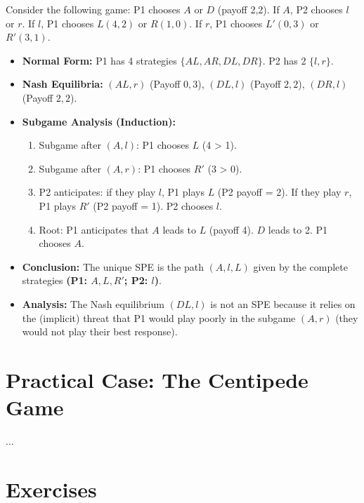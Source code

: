\begin{exemple}
Consider the following game: P1 chooses $A$ or $D$ (payoff 2,2). If $A$, P2 chooses $l$ or $r$. If $l$, P1 chooses $L(4,2)$ or $R(1,0)$. If $r$, P1 chooses $L'(0,3)$ or $R'(3,1)$.
\begin{itemize}
    \item \textbf{Normal Form:} P1 has 4 strategies $\{AL, AR, DL, DR\}$. P2 has 2 $\{l, r\}$.
    \item \textbf{Nash Equilibria:} $(AL, r)$ (Payoff $0,3$), $(DL, l)$ (Payoff $2,2$), $(DR, l)$ (Payoff $2,2$).
    \item \textbf{Subgame Analysis (Induction):}
    \begin{enumerate}
        \item Subgame after $(A,l)$: P1 chooses $L$ (4 > 1).
        \item Subgame after $(A,r)$: P1 chooses $R'$ (3 > 0).
        \item P2 anticipates: if they play $l$, P1 plays $L$ (P2 payoff = 2). If they play $r$, P1 plays $R'$ (P2 payoff = 1). P2 chooses $l$.
        \item Root: P1 anticipates that $A$ leads to $L$ (payoff 4). $D$ leads to 2. P1 chooses $A$.
    \end{enumerate}
    \item \textbf{Conclusion:} The unique SPE is the path $(A, l, L)$ given by the complete strategies \textbf{(P1: $A, L, R'$; P2: $l$)}.
    \item \textbf{Analysis:} The Nash equilibrium $(DL, l)$ is not an SPE because it relies on the (implicit) threat that P1 would play poorly in the subgame $(A,r)$ (they would not play their best response).
\end{itemize}
\end{exemple}

\section{Practical Case: The Centipede Game}
...

\section{Exercises}
